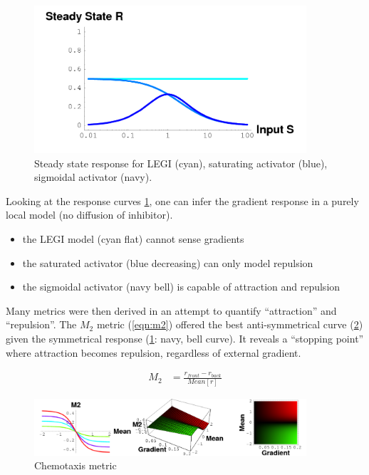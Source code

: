 \documentclass{article}
\begin{document}
\begin{figure}
    \centering
    \includegraphics[width=0.9\textwidth]{ssR.png}
    \caption{Steady state response for LEGI (cyan),
        saturating activator (blue), sigmoidal activator (navy).
        \label{fig:ssR}}
\end{figure}

Looking at the response curves \cref{fig:ssR}, 
one can infer the gradient response 
in a purely local model (no diffusion of inhibitor). 
\begin{itemize}
    \item the LEGI model (cyan flat) cannot sense gradients
    \item the saturated activator (blue decreasing) can only model repulsion
    \item the sigmoidal activator (navy bell) is capable of attraction and
        repulsion 
\end{itemize}

Many metrics were then derived in an attempt to quantify ``attraction'' and
``repulsion''.
The $M_2$ metric (\cref{eqn:m2}) offered the best anti-symmetrical curve 
(\cref{fig:metric}) given the symmetrical response (\cref{fig:ssR}: navy, bell
curve). It reveals a ``stopping point'' where attraction becomes repulsion,
regardless of external gradient.

\begin{align}
    M_2 &= \frac{ r_{front} - r_{back} }{ Mean[r] } \label{eqn:m2}
\end{align}

\begin{figure}
    \centering
    \includegraphics[width=0.9\textwidth]{metric.png}
    \caption{Chemotaxis metric \label{fig:metric}}
\end{figure}
\end{document}
